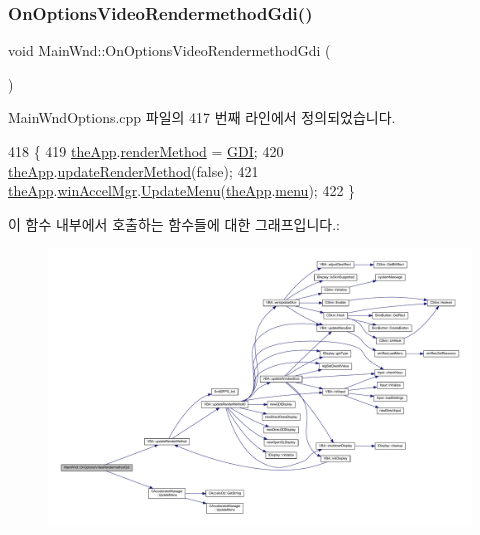 \subsubsection{\texorpdfstring{On\+Options\+Video\+Rendermethod\+Gdi()}{OnOptionsVideoRendermethodGdi()}}
{\footnotesize\ttfamily void Main\+Wnd\+::\+On\+Options\+Video\+Rendermethod\+Gdi (\begin{DoxyParamCaption}{ }\end{DoxyParamCaption})\hspace{0.3cm}{\ttfamily [protected]}}



Main\+Wnd\+Options.\+cpp 파일의 417 번째 라인에서 정의되었습니다.


\begin{DoxyCode}
418 \{
419   \mbox{\hyperlink{_v_b_a_8cpp_a8095a9d06b37a7efe3723f3218ad8fb3}{theApp}}.\mbox{\hyperlink{class_v_b_a_ae31026d8986a7658f3aaa46fba9de663}{renderMethod}} = \mbox{\hyperlink{_display_8h_aa50f63b0688d0250e0be64d8401d09a0ac22b78df6634245907697ac0ba4b87af}{GDI}};
420   \mbox{\hyperlink{_v_b_a_8cpp_a8095a9d06b37a7efe3723f3218ad8fb3}{theApp}}.\mbox{\hyperlink{class_v_b_a_a1d5b9c4597d5c565ce4d8ba1e594a89f}{updateRenderMethod}}(\textcolor{keyword}{false});
421   \mbox{\hyperlink{_v_b_a_8cpp_a8095a9d06b37a7efe3723f3218ad8fb3}{theApp}}.\mbox{\hyperlink{class_v_b_a_ad7ebce057dbde0ca88cee75e84721a89}{winAccelMgr}}.\mbox{\hyperlink{class_c_accelerator_manager_ac7411d20f413ea0ec3bd65705b564adf}{UpdateMenu}}(\mbox{\hyperlink{_v_b_a_8cpp_a8095a9d06b37a7efe3723f3218ad8fb3}{theApp}}.\mbox{\hyperlink{class_v_b_a_acf9d855b5b959a2df9c6cb21b888366e}{menu}});
422 \}
\end{DoxyCode}
이 함수 내부에서 호출하는 함수들에 대한 그래프입니다.\+:
\nopagebreak
\begin{figure}[H]
\begin{center}
\leavevmode
\includegraphics[width=350pt]{class_main_wnd_a0418a1b43cf05159e2e0679bc538e669_cgraph}
\end{center}
\end{figure}
\mbox{\label{class_main_wnd_ad8709590f7d9289c19ec3a216490d742}} 
